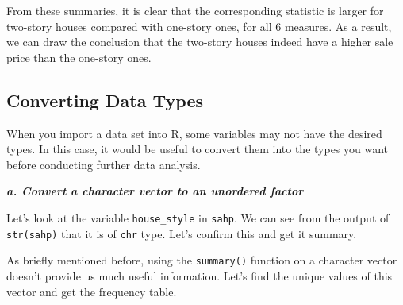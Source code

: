 \documentclass[
]{book}
\newenvironment{Shaded}{\begin{snugshade}}{\end{snugshade}}
\newcommand{\CommentTok}[1]{\textcolor[rgb]{0.56,0.35,0.01}{\textit{#1}}}
\newcommand{\FunctionTok}[1]{\textcolor[rgb]{0.00,0.00,0.00}{#1}}
\newcommand{\NormalTok}[1]{#1}
\newcommand{\SpecialCharTok}[1]{\textcolor[rgb]{0.00,0.00,0.00}{#1}}
\begin{document}
From these summaries, it is clear that the corresponding statistic is larger for two-story houses compared with one-story ones, for all 6 measures. As a result, we can draw the conclusion that the two-story houses indeed have a higher sale price than the one-story ones.

\hypertarget{converting-data-types}{%
\subsection{Converting Data Types}\label{converting-data-types}}

When you import a data set into R, some variables may not have the desired types. In this case, it would be useful to convert them into the types you want before conducting further data analysis.

\textbf{\emph{a. Convert a character vector to an unordered factor}}

Let's look at the variable \texttt{house\_style} in \texttt{sahp}. We can see from the output of \texttt{str(sahp)} that it is of \texttt{chr} type. Let's confirm this and get it summary.

\begin{Shaded}
\end{Shaded}

As briefly mentioned before, using the \texttt{summary()} function on a character vector doesn't provide us much useful information. Let's find the unique values of this vector and get the frequency table.

\begin{Shaded}
\end{Shaded}
\end{document}
